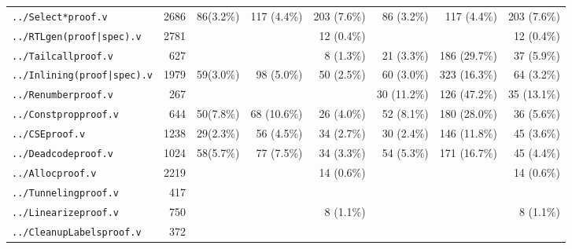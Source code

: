 \begin{tabular}{|l||r||r|r|r||r|r|r|}
\texttt{../Select*proof.v} & 2686 & 86\phantom{0}(3.2\%) & 117 \phantom{0}(4.4\%) & \cellcolor[gray]{0.8}203 \phantom{0}(7.6\%) & 86 \phantom{0}(3.2\%) & 117 \phantom{0}(4.4\%) & 203 \phantom{0}(7.6\%) \\
\texttt{../RTLgen(proof|spec).v} & 2781 & \phantom{ (00.0\%)} & \phantom{ (00.0\%)} & 12 \phantom{0}(0.4\%) & \phantom{ (00.0\%)} & \phantom{ (00.0\%)} & 12 \phantom{0}(0.4\%) \\
\texttt{../Tailcallproof.v} & 627 & \phantom{ (00.0\%)} & \phantom{ (00.0\%)} & 8 \phantom{0}(1.3\%) & 21 \phantom{0}(3.3\%) & \cellcolor[gray]{0.8}186 (29.7\%) & 37 \phantom{0}(5.9\%) \\
\texttt{../Inlining(proof|spec).v} & 1979 & 59\phantom{0}(3.0\%) & 98 \phantom{0}(5.0\%) & \cellcolor[gray]{0.8}50 \phantom{0}(2.5\%) & 60 \phantom{0}(3.0\%) & \cellcolor[gray]{0.8}323 (16.3\%) & 64 \phantom{0}(3.2\%) \\
\texttt{../Renumberproof.v} & 267 & \phantom{ (00.0\%)} & \phantom{ (00.0\%)} & \phantom{ (00.0\%)} & 30 (11.2\%) & \cellcolor[gray]{0.8}126 (47.2\%) & 35 (13.1\%) \\
\texttt{../Constpropproof.v} & 644 & 50\phantom{0}(7.8\%) & 68 (10.6\%) & \cellcolor[gray]{0.8}26 \phantom{0}(4.0\%) & 52 \phantom{0}(8.1\%) & \cellcolor[gray]{0.8}180 (28.0\%) & 36 \phantom{0}(5.6\%) \\
\texttt{../CSEproof.v} & 1238 & 29\phantom{0}(2.3\%) & 56 \phantom{0}(4.5\%) & \cellcolor[gray]{0.8}34 \phantom{0}(2.7\%) & 30 \phantom{0}(2.4\%) & \cellcolor[gray]{0.8}146 (11.8\%) & 45 \phantom{0}(3.6\%) \\
\texttt{../Deadcodeproof.v} & 1024 & 58\phantom{0}(5.7\%) & 77 \phantom{0}(7.5\%) & \cellcolor[gray]{0.8}34 \phantom{0}(3.3\%) & 54 \phantom{0}(5.3\%) & \cellcolor[gray]{0.8}171 (16.7\%) & 45 \phantom{0}(4.4\%) \\
\texttt{../Allocproof.v} & 2219 & \phantom{ (00.0\%)} & \phantom{ (00.0\%)} & 14 \phantom{0}(0.6\%) & \phantom{ (00.0\%)} & \phantom{ (00.0\%)} & 14 \phantom{0}(0.6\%) \\
\texttt{../Tunnelingproof.v} & 417 & \phantom{ (00.0\%)} & \phantom{ (00.0\%)} & \phantom{ (00.0\%)} & \phantom{ (00.0\%)} & \phantom{ (00.0\%)} & \phantom{ (00.0\%)} \\
\texttt{../Linearizeproof.v} & 750 & \phantom{ (00.0\%)} & \phantom{ (00.0\%)} & 8 \phantom{0}(1.1\%) & \phantom{ (00.0\%)} & \phantom{ (00.0\%)} & 8 \phantom{0}(1.1\%) \\
\texttt{../CleanupLabelsproof.v} & 372 & \phantom{ (00.0\%)} & \phantom{ (00.0\%)} & \phantom{ (00.0\%)} & \phantom{ (00.0\%)} & \phantom{ (00.0\%)} & \phantom{ (00.0\%)} \\

\end{tabular}
